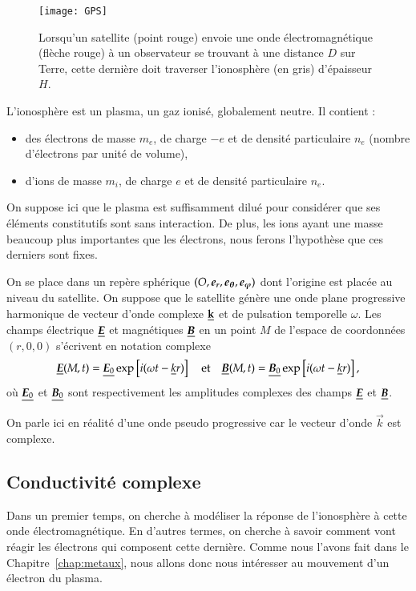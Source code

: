 \begin{figure}[t]
	\centering
	\texttt{[image: GPS]}
	\caption{Lorsqu'un satellite (point rouge) envoie une onde 
		électromagnétique (flèche rouge)
		à un observateur se trouvant à une distance $D$ sur Terre,
		cette dernière doit traverser l'ionosphère (en gris) d'épaisseur
		$H$.}%
	\label{fig:maxwell_GPS}
\end{figure}

L'ionosphère est un plasma, un gaz ionisé, globalement neutre. Il contient :
\begin{itemize}
	\item des électrons de masse $m_e$, de charge $-e$ et de densité particulaire
	  $n_e$ (nombre d'électrons par unité de volume),
	\item d'ions de masse $m_i$, de charge $e$ et de densité particulaire $n_e$.
\end{itemize}
On suppose ici que le plasma est suffisamment dilué pour considérer que ses éléments 
constitutifs sont sans interaction. De plus, les ions ayant une masse beaucoup plus
importantes que les électrons, nous ferons l'hypothèse que ces derniers sont fixes.

On se place dans un repère sphérique $(O, \er, \etheta, \ephi)$ dont l'origine est 
placée au niveau du satellite. On suppose que le satellite génère une onde plane
progressive harmonique de vecteur d'onde complexe $\underline{\mathbf{k}}$ et de pulsation
temporelle $\omega$. Les champs électrique $\complex{\vece}$ et magnétiques 
$\complex{\vecb}$ en un point $M$ de l'espace de coordonnées $(r, 0, 0)$ 
s'écrivent en notation complexe
\begin{equation*}
	\complex{\vece}(M, t) = \complex{\vece_0} 
	\exp\left[i(\omega t - \complex{k} r
	)\right]
	\quad \mathrm{et} \quad
	\complex{\vecb}(M, t) = \complex{\vecb_0} 
	\exp\left[i(\omega t - \complex{k} r
	)\right],
\end{equation*}
où $\complex{\vece_0}$ et $\complex{\vecb_0}$ sont respectivement 
les amplitudes complexes des champs $\complex{\vece}$ et $\complex{\vecb}$.

\begin{rem}
	On parle ici en réalité d'une onde pseudo progressive 
	car le vecteur d'onde $\vec{k}$ est complexe.
\end{rem}

\subsection{Conductivité complexe}
Dans un premier temps, on cherche à modéliser la réponse de l'ionosphère à cette onde 
électromagnétique. En d'autres termes, on cherche à savoir comment vont réagir les
électrons qui composent cette dernière. Comme nous l'avons fait dans le 
Chapitre~\ref{chap:metaux}, nous allons donc nous intéresser au mouvement d'un électron
du plasma.

